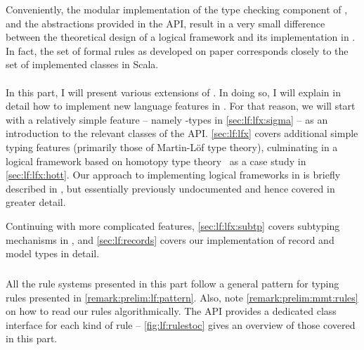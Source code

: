 Conveniently, the modular implementation of the type checking component of \mmt, and the abstractions provided in the \mmt API, result in a very small difference between the theoretical design of a logical framework and its implementation in \mmt. In fact, the set of formal rules as developed on paper corresponds closely to the set of implemented classes in Scala.

\paragraph{} In this part, I will present various extensions of \LF. %
In doing so, I will explain in detail how to implement new language features in \mmt. For that reason, we will start with a relatively simple feature -- namely \sigmasym-types in \autoref{sec:lf:lfx:sigma} -- as an introduction to the relevant classes of the \mmt API. \autoref{sec:lf:lfx} covers additional simple typing features (primarily those of Martin-Löf type theory), culminating in a logical framework based on homotopy type theory~\cite{hottbook} as a case study in \autoref{sec:lf:lfx:hott}. Our approach to implementing logical frameworks in \mmt is briefly described in \cite{MueRab:rpfsm}, but essentially previously undocumented and hence covered in greater detail.

Continuing with more complicated features, \autoref{sec:lf:lfx:subtp} covers subtyping mechanisms in \mmt, and \autoref{sec:lf:records} covers our implementation of record and model types in detail. %

\subparagraph{} All the rule systems presented in this part follow a general pattern for typing rules presented in \autoref{remark:prelim:lf:pattern}. Also, note \autoref{remark:prelim:mmt:rules} on how to read our rules algorithmically. The \mmt API provides a dedicated class interface for each kind of rule -- \autoref{fig:lf:rulestoc} gives an overview of those covered in this part.

